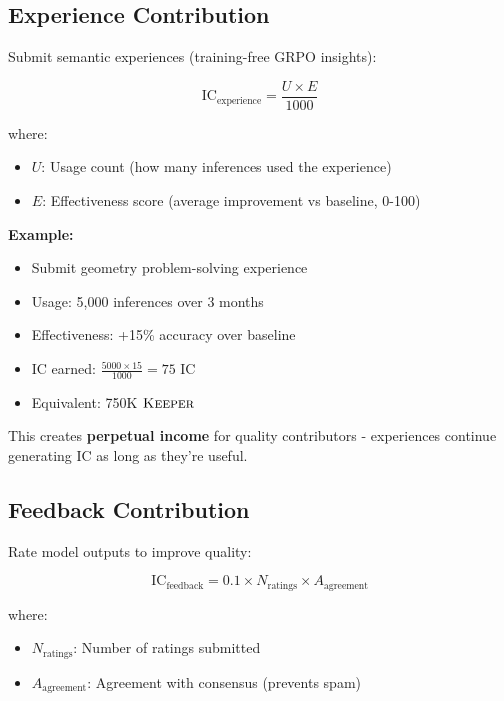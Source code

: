 \documentclass[11pt,letterpaper]{article}
\theoremstyle{definition}
\theoremstyle{remark}
\newcommand{\KEEPER}{\textsc{Keeper}}
\begin{document}
\subsection{Experience Contribution}

Submit semantic experiences (training-free GRPO insights):

\begin{equation}
\text{IC}_{\text{experience}} = \frac{U \times E}{1000}
\end{equation}

where:
\begin{itemize}
\item $U$: Usage count (how many inferences used the experience)
\item $E$: Effectiveness score (average improvement vs baseline, 0-100)
\end{itemize}

\textbf{Example:}
\begin{itemize}
\item Submit geometry problem-solving experience
\item Usage: 5,000 inferences over 3 months
\item Effectiveness: +15\% accuracy over baseline
\item IC earned: $\frac{5000 \times 15}{1000} = 75$ IC
\item Equivalent: 750K $\KEEPER$
\end{itemize}

This creates \textbf{perpetual income} for quality contributors - experiences continue generating IC as long as they're useful.

\subsection{Feedback Contribution}

Rate model outputs to improve quality:

\begin{equation}
\text{IC}_{\text{feedback}} = 0.1 \times N_{\text{ratings}} \times A_{\text{agreement}}
\end{equation}

where:
\begin{itemize}
\item $N_{\text{ratings}}$: Number of ratings submitted
\item $A_{\text{agreement}}$: Agreement with consensus (prevents spam)
\end{itemize}
\end{document}
